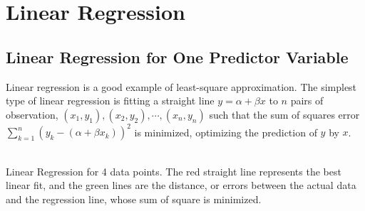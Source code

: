 \section{Linear Regression}
\subsection{Linear Regression for One Predictor Variable}

Linear regression is a good example of least-square approximation. The simplest type of linear regression is fitting a straight line $y = \alpha + \beta x$ to $n$ pairs of observation, $(x_1, y_1), (x_2, y_2), \cdots, (x_n, y_n)$ such that the sum of squares error $\sum_{k=1}^n (y_k - (\alpha + \beta x_k))^2$ is minimized, optimizing the prediction of $y$ by $x$.

\begin{center}
\\
Linear Regression for 4 data points. The red straight line represents the best linear fit, and the green lines are the distance, or errors between the actual data and the regression line, whose sum of square is minimized.
\end{center}

